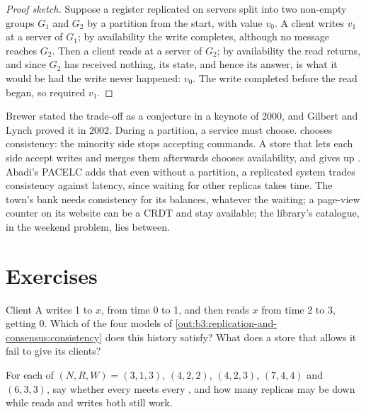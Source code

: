 \begin{proof}[Proof sketch]
Suppose a register replicated on servers split into two non-empty groups $G_1$ and $G_2$ by a partition from the start, with value $v_0$. A client writes $v_1$ at a server of $G_1$; by availability the write completes, although no message reaches $G_2$. Then a client reads at a server of $G_2$; by availability the read returns, and since $G_2$ has received nothing, its state, and hence its answer, is what it would be had the write never happened: $v_0$. The write completed before the read began, so  required $v_1$.
\end{proof}

Brewer stated the trade-off as a conjecture in a keynote of 2000, and Gilbert and Lynch proved it in 2002. %
During a partition, a service must choose.  chooses consistency: the minority side stops accepting commands. A store that lets each side accept writes and merges them afterwards chooses availability, and gives up . Abadi's PACELC adds that even without a partition, a replicated system trades consistency against latency, since waiting for other replicas takes time. %
The town's bank needs consistency for its balances, whatever the waiting; a page-view counter on its website can be a CRDT and stay available; the library's catalogue, in the weekend problem, lies between.

\section{Exercises}\label{sec:b3:replication-and-consensus:exercises}

\begin{exercise}[$\star$]\label{exo:b3:replication-and-consensus:1}
Client A writes 1 to $x$, from time 0 to 1, and then reads $x$ from time 2 to 3, getting 0. Which of the four models of \cref{out:b3:replication-and-consensus:consistency} does this history satisfy? What does a store that allows it fail to give its clients?
\end{exercise}

\begin{exercise}[$\star$]\label{exo:b3:replication-and-consensus:2}
For each of $(N, R, W) = (3, 1, 3)$, $(4, 2, 2)$, $(4, 2, 3)$, $(7, 4, 4)$ and $(6, 3, 3)$, say whether every  meets every , and how many replicas may be down while reads and writes both still work.
\end{exercise}

